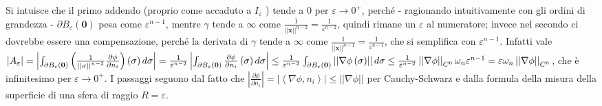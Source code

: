 \documentclass{article}
\begin{document}
Si intuisce che il primo addendo (proprio come accaduto a $I_{\varepsilon }$%
) tende a $0$ per $\varepsilon \rightarrow 0^{+}$, perch\'{e} - ragionando
intuitivamente con gli ordini di grandezza - $\partial B_{\varepsilon
}\left( \mathbf{0}\right) $ pesa come $\varepsilon ^{n-1}$, mentre $\gamma $
tende a $\infty $ come $\frac{1}{\left\vert \left\vert \mathbf{x}\right\vert
\right\vert ^{n-2}}=\frac{1}{\varepsilon ^{n-2}}$, quindi rimane un $%
\varepsilon $ al numeratore; invece nel secondo ci dovrebbe essere una
compensazione, perch\'{e} la derivata di $\gamma $ tende a $\infty $ come $%
\frac{1}{\left\vert \left\vert \mathbf{x}\right\vert \right\vert ^{n-1}}=%
\frac{1}{\varepsilon ^{n-1}}$, che si semplifica con $\varepsilon ^{n-1}$.
Infatti vale $\left\vert A_{\varepsilon }\right\vert =\left\vert
\int_{\partial B_{\varepsilon }\left( \mathbf{0}\right) }\left( \frac{1}{%
\left\vert \left\vert \sigma \right\vert \right\vert ^{n-2}}\frac{\partial
\phi }{\partial n_{i}}\right) \left( \sigma \right) d\sigma \right\vert =%
\frac{1}{\varepsilon ^{n-2}}\left\vert \int_{\partial B_{\varepsilon }\left( 
\mathbf{0}\right) }\frac{\partial \phi }{\partial n_{i}}\left( \sigma
\right) d\sigma \right\vert \leq \frac{1}{\varepsilon ^{n-2}}\int_{\partial
B_{\varepsilon }\left( \mathbf{0}\right) }\left\vert \left\vert \nabla \phi
\left( \sigma \right) \right\vert \right\vert d\sigma \leq \frac{1}{%
\varepsilon ^{n-2}}\left\vert \left\vert \nabla \phi \right\vert \right\vert
_{C^{0}}\omega _{n}\varepsilon ^{n-1}=\varepsilon \omega _{n}\left\vert
\left\vert \nabla \phi \right\vert \right\vert _{C^{0}}$, che \`{e}
infinitesimo per $\varepsilon \rightarrow 0^{+}$. I passaggi seguono dal
fatto che $\left\vert \frac{\partial \phi }{\partial n_{i}}\right\vert
=\left\vert \left\langle \nabla \phi ,n_{i}\right\rangle \right\vert \leq
\left\vert \left\vert \nabla \phi \right\vert \right\vert $ per
Cauchy-Schwarz e dalla formula della misura della superficie di una sfera di
raggio $R=\varepsilon $.
\end{document}
